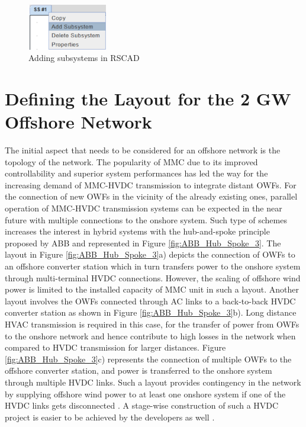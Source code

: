 \begin{figure}[H]
\centering
    \includegraphics[height = 2cm,width = 3.5cm]{Diagrams/Chapter_3/Subsystem.PNG}
    \caption{Adding subsystems in RSCAD}
    \label{fig:subsystem_RSCAD}
\end{figure}


\section{Defining the Layout for the 2 GW Offshore Network}
The initial aspect that needs to be considered for an offshore network is the topology of the network. The popularity of \gls{MMC} due to its improved controllability and superior system performances has led the way for the increasing demand of \gls{MMC}-\gls{HVDC} transmission to integrate distant \gls{OWF}s. For the connection of new \gls{OWF}s in the vicinity of the already existing ones, parallel operation of \gls{MMC}-\gls{HVDC} transmission systems can be expected in the near future with multiple connections to the onshore system. Such type of schemes increases the interest in hybrid systems with the hub-and-spoke principle proposed by ABB \cite{abb_hvdc_2018} and represented in Figure \ref{fig:ABB_Hub_Spoke_3}. The layout in Figure \ref{fig:ABB_Hub_Spoke_3}a) depicts the connection of \gls{OWF}s to an offshore converter station which in turn transfers power to the onshore system through multi-terminal \gls{HVDC} connections. However, the scaling of offshore wind power is limited to the installed capacity of \gls{MMC} unit in such a layout. Another layout involves the \gls{OWF}s connected through \gls{AC} links to a back-to-back \gls{HVDC} converter station as shown in Figure \ref{fig:ABB_Hub_Spoke_3}b). Long distance \gls{HVAC} transmission is required in this case, for the transfer of power from \gls{OWF}s to the onshore network and hence contribute to high losses in the network when compared to \gls{HVDC} transmission for larger distances. Figure \ref{fig:ABB_Hub_Spoke_3}c) represents the connection of multiple \gls{OWF}s to the offshore converter station, and power is transferred to the onshore system through multiple \gls{HVDC} links. Such a layout provides contingency in the network by supplying offshore wind power to at least one onshore system if one of the \gls{HVDC} links gets disconnected \cite{lescale2012parallelling}. A stage-wise construction of such a \gls{HVDC} project is easier to be achieved by the developers as well \cite{cigre_B455}.

